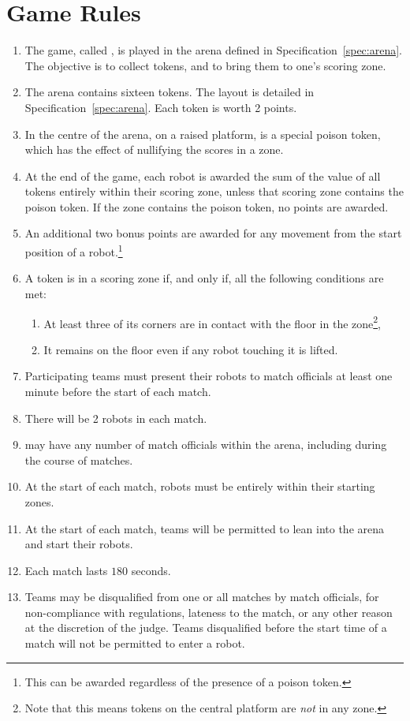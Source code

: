 \section{Game Rules}
\label{sec:rules}

\begin{enumerate}
  \item The game, called \emph{\gamename}, is played in the arena defined in
        Specification~\ref{spec:arena}. The objective is to collect tokens, and
        to bring them to one's scoring zone.
  \item The arena contains sixteen tokens. The layout is detailed in
        Specification~\ref{spec:arena}. Each token is worth 2 points.
  \item In the centre of the arena, on a raised platform, is a special poison
        token, which has the effect of nullifying the scores in a zone.
  \item At the end of the game, each robot is awarded the sum of the value of
        all tokens entirely within their scoring zone, unless that scoring zone
        contains the poison token. If the zone contains the poison token, no
        points are awarded.
  \item An additional two bonus points are awarded for any movement from the
        start position of a robot.\footnote{This can be awarded regardless of
        the presence of a poison token.}
  \item A token is in a scoring zone if, and only if, all the following
        conditions are met:
        \begin{enumerate}
          \item At least three of its corners are in contact with the floor in
                the zone\footnote{Note that this means tokens on the central
                platform are \emph{not} in any zone.},
          \item It remains on the floor even if any robot touching it is lifted.
        \end{enumerate}
  \item Participating teams must present their robots to match officials at
        least one minute before the start of each match.
  \item There will be 2 robots in each match.
  \item \org may have any number of match officials within the arena, including
        during the course of matches.
  \item At the start of each match, robots must be entirely within their
        starting zones.
  \item At the start of each match, teams will be permitted to lean into the
        arena and start their robots.
  \item Each match lasts $180$ seconds.
  \item Teams may be disqualified from one or all matches by match officials,
        for non-compliance with regulations, lateness to the match, or any other
        reason at the discretion of the judge. Teams disqualified before the
        start time of a match will not be permitted to enter a robot.
\end{enumerate}

